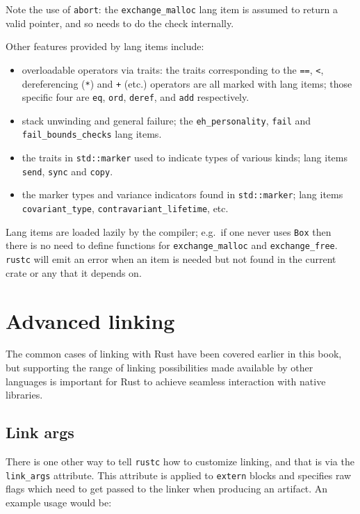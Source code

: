 \documentclass[a4paper,]{book}
\begin{document}
Note the use of \texttt{abort}: the \texttt{exchange\_malloc} lang item
is assumed to return a valid pointer, and so needs to do the check
internally.

Other features provided by lang items include:

\begin{itemize}
\itemsep1pt\parskip0pt
\item
  overloadable operators via traits: the traits corresponding to the
  \texttt{==}, \texttt{\textless{}}, dereferencing (\texttt{*}) and
  \texttt{+} (etc.) operators are all marked with lang items; those
  specific four are \texttt{eq}, \texttt{ord}, \texttt{deref}, and
  \texttt{add} respectively.
\item
  stack unwinding and general failure; the \texttt{eh\_personality},
  \texttt{fail} and \texttt{fail\_bounds\_checks} lang items.
\item
  the traits in \texttt{std::marker} used to indicate types of various
  kinds; lang items \texttt{send}, \texttt{sync} and \texttt{copy}.
\item
  the marker types and variance indicators found in
  \texttt{std::marker}; lang items \texttt{covariant\_type},
  \texttt{contravariant\_lifetime}, etc.
\end{itemize}

Lang items are loaded lazily by the compiler; e.g.~if one never uses
\texttt{Box} then there is no need to define functions for
\texttt{exchange\_malloc} and \texttt{exchange\_free}. \texttt{rustc}
will emit an error when an item is needed but not found in the current
crate or any that it depends on.

\section{Advanced linking}\label{sec--advanced-linking}

The common cases of linking with Rust have been covered earlier in this
book, but supporting the range of linking possibilities made available
by other languages is important for Rust to achieve seamless interaction
with native libraries.

\subsection{Link args}\label{link-args}

There is one other way to tell \texttt{rustc} how to customize linking,
and that is via the \texttt{link\_args} attribute. This attribute is
applied to \texttt{extern} blocks and specifies raw flags which need to
get passed to the linker when producing an artifact. An example usage
would be:
\end{document}
